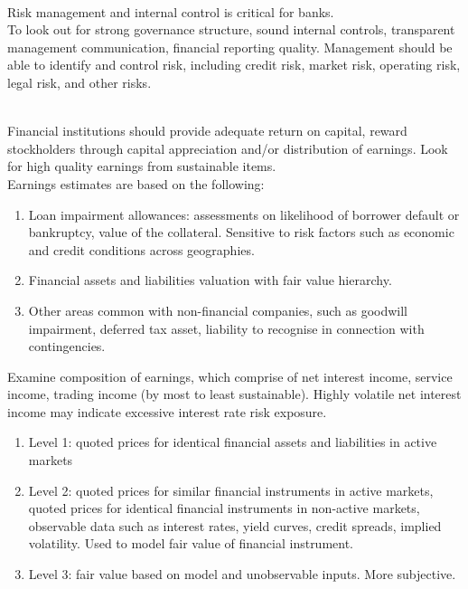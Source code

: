 \begin{definition} \\
Risk management and internal control is critical for banks.\\
To look out for strong governance structure, sound internal controls, transparent management communication, financial reporting quality. Management should be able to identify and control risk, including credit risk, market risk, operating risk, legal risk, and other risks.
\end{definition}

\begin{definition} \\
Financial institutions should provide adequate return on capital, reward stockholders through capital appreciation and/or distribution of earnings. Look for high quality earnings from sustainable items.\\
Earnings estimates are based on the following:
\begin{enumerate}[label=\roman*.]
\setlength{\itemsep}{0pt}
\item Loan impairment allowances: assessments on likelihood of borrower default or bankruptcy, value of the collateral. Sensitive to risk factors such as economic and credit conditions across geographies.
\item Financial assets and liabilities valuation with fair value hierarchy.
\item Other areas common with non-financial companies, such as goodwill impairment, deferred tax asset, liability to recognise in connection with contingencies.
\end{enumerate}
Examine composition of earnings, which comprise of net interest income, service income, trading income (by most to least sustainable). Highly volatile net interest income may indicate excessive interest rate risk exposure.
\end{definition}

\begin{definition} 
\begin{enumerate}[label=\roman*.]
\setlength{\itemsep}{0pt}
\item Level 1: quoted prices for identical financial assets and liabilities in active markets
\item Level 2: quoted prices for similar financial instruments in active markets, quoted prices for identical financial instruments in non-active markets, observable data such as interest rates, yield curves, credit spreads, implied volatility. Used to model fair value of financial instrument.
\item Level 3: fair value based on model and unobservable inputs. More subjective.
\end{enumerate}
\end{definition}

